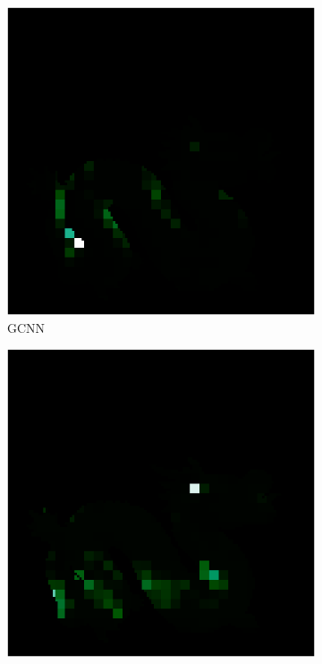 \begin{figure}[H]
\begin{minipage}{0.32\linewidth}
		\begin{subfigure}[t]{0.45\linewidth}
			\includegraphics[width=\linewidth]{./Figures/feature_map_gcnn/feature_map_gcnn-gcnn_15.png}
			\caption{GCNN}
		\end{subfigure}
		\begin{subfigure}[t]{0.45\linewidth}
			\includegraphics[width=\linewidth]{./Figures/feature_map_gcnn/feature_map_gcnn-gcnn_127.png}
		\end{subfigure}
		

\end{minipage}
\end{figure}
